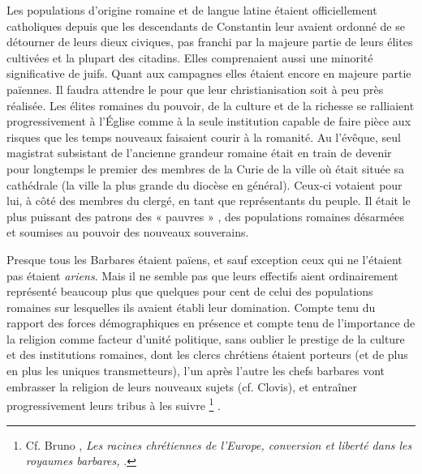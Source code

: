  Les populations d'origine romaine et de langue latine étaient officiellement catholiques depuis que les descendants de Constantin leur avaient ordonné de se détourner de leurs dieux civiques, pas franchi par la majeure partie de leurs élites cultivées et la plupart des citadins. Elles comprenaient aussi une minorité significative de juifs. Quant aux campagnes elles étaient encore en majeure partie païennes. Il faudra attendre le  pour que leur christianisation soit à peu près réalisée. Les élites romaines du pouvoir, de la culture et de la richesse se ralliaient progressivement à l’Église comme à la seule institution capable de faire pièce aux risques que les temps nouveaux faisaient courir à la romanité. Au  l'évêque, seul magistrat subsistant de l'ancienne grandeur romaine était en train de devenir pour longtemps le premier des membres de la Curie de la ville où était située sa cathédrale (la ville la plus grande du diocèse en général). Ceux-ci votaient pour lui, à côté des membres du clergé, en tant que représentants du peuple. Il était le plus puissant des patrons des « pauvres » , des populations romaines désarmées et soumises au pouvoir des nouveaux souverains. 

 Presque tous les Barbares étaient païens, et sauf exception ceux qui ne l'étaient pas étaient \emph{ariens}. Mais il ne semble pas que leurs effectifs aient ordinairement représenté beaucoup plus que quelques pour cent de celui des populations romaines sur lesquelles ils avaient établi leur domination. Compte tenu du rapport des forces démographiques en présence et compte tenu de l'importance de la religion comme facteur d'unité politique, sans oublier le prestige de la culture et des institutions romaines, dont les clercs chrétiens étaient porteurs (et de plus en plus les uniques transmetteurs), l'un après l'autre les chefs barbares vont embrasser la religion de leurs nouveaux sujets (cf. Clovis), et entraîner progressivement leurs tribus à les suivre%
\footnote{Cf. Bruno , \emph{Les racines chrétiennes de l'Europe, conversion et liberté dans les royaumes barbares, }.}
. 

